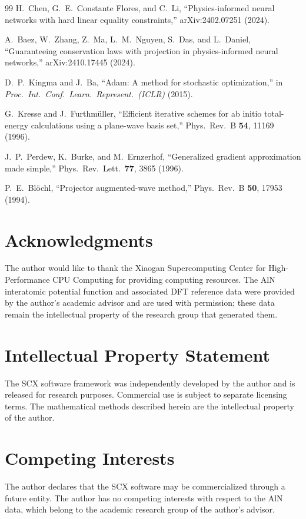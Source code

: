 \documentclass[twoside,prb,aps,floatfix,superscriptaddress,longbibliography]{revtex4-2}
\begin{document}
\begin{thebibliography}{99}
H.~Chen, G.~E.~Constante Flores, and C.~Li, ``Physics-informed neural networks with hard linear equality constraints,'' arXiv:2402.07251 (2024).

A.~Baez, W.~Zhang, Z.~Ma, L.~M.~Nguyen, S.~Das, and L.~Daniel, ``Guaranteeing conservation laws with projection in physics-informed neural networks,'' arXiv:2410.17445 (2024).

D.~P.~Kingma and J.~Ba, ``Adam: A method for stochastic optimization,'' in \textit{Proc.\ Int.\ Conf.\ Learn.\ Represent.\ (ICLR)} (2015).

G.~Kresse and J.~Furthm\"{u}ller, ``Efficient iterative schemes for ab initio total-energy calculations using a plane-wave basis set,'' Phys.\ Rev.\ B \textbf{54}, 11169 (1996).

J.~P.~Perdew, K.~Burke, and M.~Ernzerhof, ``Generalized gradient approximation made simple,'' Phys.\ Rev.\ Lett.\ \textbf{77}, 3865 (1996).

P.~E.~Bl\"{o}chl, ``Projector augmented-wave method,'' Phys.\ Rev.\ B \textbf{50}, 17953 (1994).

\end{thebibliography}

\section*{Acknowledgments}
The author would like to thank the Xiaogan Supercomputing Center for High-Performance CPU Computing for providing computing resources. The AlN interatomic potential function and associated DFT reference data were provided by the author's academic advisor and are used with permission; these data remain the intellectual property of the research group that generated them.

\section*{Intellectual Property Statement}
The SCX software framework was independently developed by the author and is released  for research purposes. Commercial use is subject to separate licensing terms. The mathematical methods described herein are the intellectual property of the author.

\section*{Competing Interests}
The author declares that the SCX software may be commercialized through a future entity. The author has no competing interests with respect to the AlN data, which belong to the academic research group of the author's advisor.
\end{document}

